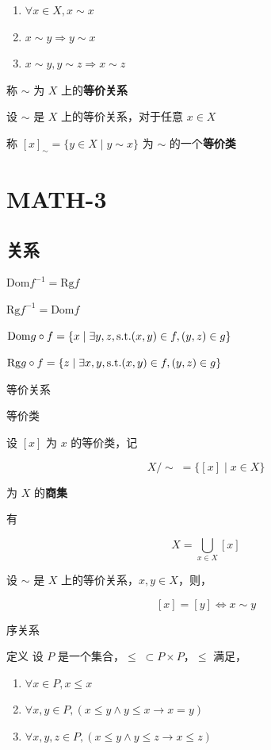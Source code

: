 \begin{enumerate}
\def\labelenumi{\arabic{enumi}.}
\tightlist
\item
  \(\forall x \in X, x \sim x\)
\item
  \(x \sim y \Rightarrow y \sim x\)
\item
  \(x \sim y, y \sim z \Rightarrow x \sim z\)
\end{enumerate}

称 \(\sim\) 为 \(X\) 上的\textbf{等价关系}

设 \(\sim\) 是 \(X\) 上的等价关系，对于任意 \(x\in X\)

称 \([x]_\sim =\{y \in X \mid y \sim x\}\) 为 \(\sim\)
的一个\textbf{等价类}

\section{MATH-3}\label{math-3}

\subsection{关系}\label{ux5173ux7cfb-1}

\(\mathrm{Dom}f^{-1}=\mathrm{Rg}f\)

\(\mathrm{Rg}f^{-1}=\mathrm{Dom}f\)

\(\mathrm{Dom}\space g\circ f=\{x\mid \exists y, z, \space \text{s.t.} (x, y)\in f, (y, z)\in g\}\)

\(\mathrm{Rg}\space g \circ f=\{z\mid \exists x,y,\space\text{s.t.}(x,y)\in f, (y, z)\in g\}\)

等价关系

等价类

设 \([x]\) 为 \(x\) 的等价类，记

\[
X/\sim\;=\{[x]\mid x\in X\}
\]

为 \(X\) 的\textbf{商集}

有

\[
X=\bigcup _{x\in X} [x]
\]

设 \(\sim\) 是 \(X\) 上的等价关系，\(x,y\in X\)，则，

\[
[x]=[y]\Longleftrightarrow x \sim y
\]

序关系

定义 设 \(P\) 是一个集合，\(\le \; \subset P \times P\)，\(\le\) 满足，

\begin{enumerate}
\def\labelenumi{\arabic{enumi}.}
\tightlist
\item
  \(\forall x \in P, x \le x\)
\item
  \(\forall x, y\in P, (x\le y \wedge y\le x \to x=y)\)
\item
  \(\forall x, y, z \in P, (x\le y \wedge y \le z \to x \le z)\)
\end{enumerate}

